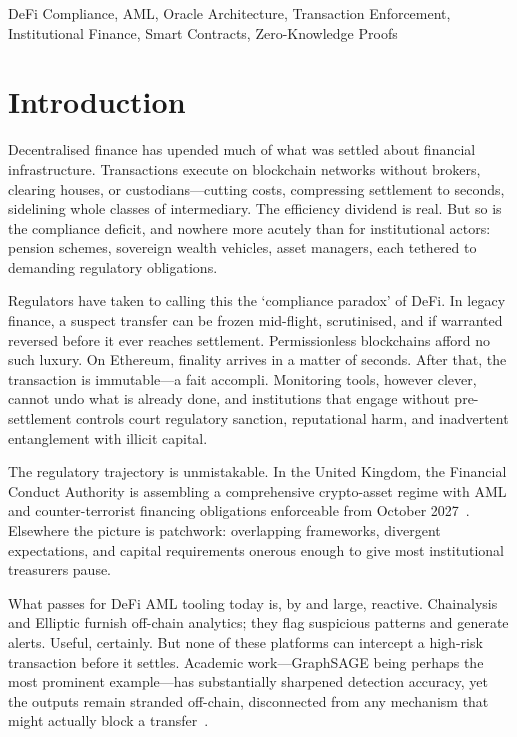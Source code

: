 \documentclass[journal]{IEEEtran}
\begin{document}
\begin{IEEEkeywords}
DeFi Compliance, AML, Oracle Architecture, Transaction Enforcement, Institutional Finance, Smart Contracts, Zero-Knowledge Proofs
\end{IEEEkeywords}

\section{Introduction}

Decentralised finance has upended much of what was settled about financial infrastructure. Transactions execute on blockchain networks without brokers, clearing houses, or custodians---cutting costs, compressing settlement to seconds, sidelining whole classes of intermediary. The efficiency dividend is real. But so is the compliance deficit, and nowhere more acutely than for institutional actors: pension schemes, sovereign wealth vehicles, asset managers, each tethered to demanding regulatory obligations.

Regulators have taken to calling this the `compliance paradox' of DeFi. In legacy finance, a suspect transfer can be frozen mid-flight, scrutinised, and if warranted reversed before it ever reaches settlement. Permissionless blockchains afford no such luxury. On Ethereum, finality arrives in a matter of seconds. After that, the transaction is immutable---a fait accompli. Monitoring tools, however clever, cannot undo what is already done, and institutions that engage without pre-settlement controls court regulatory sanction, reputational harm, and inadvertent entanglement with illicit capital.

The regulatory trajectory is unmistakable. In the United Kingdom, the Financial Conduct Authority is assembling a comprehensive crypto-asset regime with AML and counter-terrorist financing obligations enforceable from October 2027~\cite{fca2025}. Elsewhere the picture is patchwork: overlapping frameworks, divergent expectations, and capital requirements onerous enough to give most institutional treasurers pause.

What passes for DeFi AML tooling today is, by and large, reactive. Chainalysis and Elliptic furnish off-chain analytics; they flag suspicious patterns and generate alerts. Useful, certainly. But none of these platforms can intercept a high-risk transaction before it settles. Academic work---GraphSAGE being perhaps the most prominent example---has substantially sharpened detection accuracy, yet the outputs remain stranded off-chain, disconnected from any mechanism that might actually block a transfer~\cite{hamilton2017}.
\end{document}

